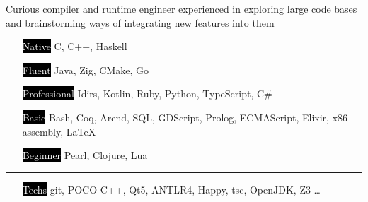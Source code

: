 \documentclass[9pt]{template/developercv}
\begin{document}
\begin{minipage}[t]{0.35\textwidth}
	\vspace{-\baselineskip}

	Curious compiler and runtime engineer experienced in exploring large code bases and brainstorming ways of integrating new features into them\\
	\bio
\end{minipage}
\hfill
\begin{minipage}[t]{0.55\textwidth}
	\vspace{-\baselineskip}
	\vspace{-0.5\baselineskip}

	\begin{itemize}
		\setlength{\itemsep}{0pt}
		\setlength{\parskip}{0.0\baselineskip}
    \setlength{\parsep}{0pt}
		\item[\colorbox{black}{\textcolor{white}{Native}}] C, C++, Haskell
		\item[\colorbox{black}{\textcolor{white}{Fluent}}] Java, Zig, CMake, Go
		\item[\colorbox{black}{\textcolor{white}{Professional}}] Idirs, Kotlin, Ruby, Python, TypeScript, C\#
		\item[\colorbox{black}{\textcolor{white}{Basic}}] Bash, Coq, Arend, SQL, GDScript, Prolog, ECMAScript, Elixir, x86 assembly, \LaTeX
		\item[\colorbox{black}{\textcolor{white}{Beginner}}] Pearl, Clojure, Lua
	\end{itemize}
	\vspace{-0.5\baselineskip}
	\noindent\hspace{-0.1\textwidth}\rule{1.1\textwidth}{0.4pt}
	\begin{itemize}
		\setlength{\itemsep}{0pt}
		\setlength{\parskip}{0.0\baselineskip}
	\setlength{\parsep}{0pt}
		\item[\colorbox{black}{\textcolor{white}{Techs}}] git, POCO C++, Qt5, ANTLR4, Happy, tsc, OpenJDK, Z3 \dots
	\end{itemize}
\end{minipage}


\end{document}
